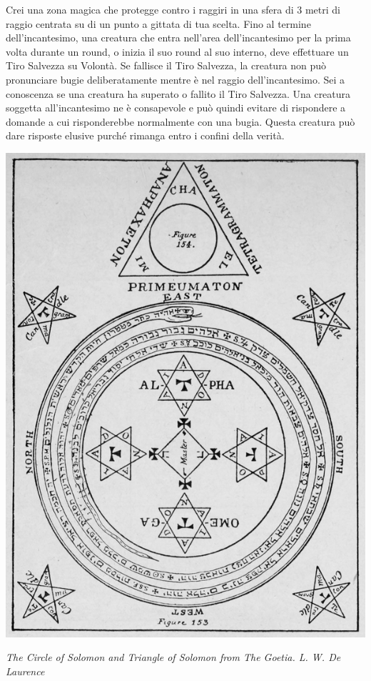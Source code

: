 \begin{multicols}{2}
Crei una zona magica che protegge contro i raggiri in una sfera di 3 metri di raggio centrata su di un punto a gittata di tua scelta. Fino al termine dell'incantesimo, una creatura che entra nell'area dell'incantesimo per la prima volta durante un round, o inizia il suo round al suo interno, deve effettuare un Tiro Salvezza su Volontà. Se fallisce il Tiro Salvezza, la creatura non può pronunciare bugie deliberatamente mentre è nel raggio dell'incantesimo. Sei a conoscenza se una creatura ha superato o fallito il Tiro Salvezza. Una creatura soggetta all'incantesimo ne è consapevole e può quindi evitare di rispondere a domande a cui risponderebbe normalmente con una bugia. Questa creatura può dare risposte elusive purché rimanga entro i confini della verità.


\bigskip



\end{multicols}

\vfill

\begin{center}
\includegraphics[keepaspectratio,width=0.5\linewidth]{immagini/Goetic_circle_from_The_Lesser_Key_of_Solomon.png}

\medskip

\emph{The Circle of Solomon and Triangle of Solomon from The Goetia. L. W. De Laurence}
\end{center}



